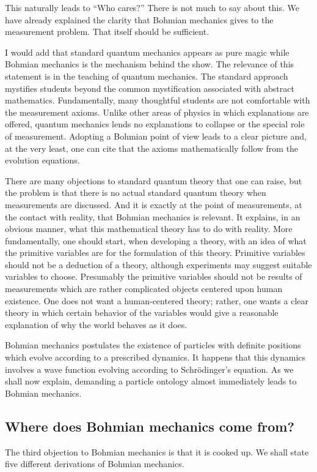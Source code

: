 \documentclass[11pt]{article}
\theoremstyle{remark}
\begin{document}
This naturally leads to ``Who cares?'' There is not much to
say about this. We have already explained the clarity that Bohmian
mechanics gives to the measurement problem. That itself should be
sufficient. 

I would add that standard quantum mechanics appears as pure magic while 
Bohmian mechanics is the mechanism behind the show. The relevance of
this statement is in the teaching of quantum mechanics. The standard
approach mystifies students beyond the common mystification associated
with abstract mathematics. Fundamentally, many thoughtful 
students are not comfortable
with the measurement axioms. Unlike other areas of physics in which
explanations are offered,  quantum mechanics lends no explanations to
collapse or the special role of measurement. Adopting a Bohmian point
of view leads to a clear picture and, at the very least, one can cite
that the axioms mathematically follow from the evolution equations.  


There are many
objections to standard quantum theory that one can raise, but the
problem is that there is no actual standard quantum theory when
measurements are discussed. And it is exactly at the point of
measurements, at the contact with reality, that Bohmian mechanics is
relevant. It explains, in an obvious manner, what this mathematical
theory has to do with reality. More fundamentally, one should start,
when developing a theory, with an idea of what the primitive variables
are for the formulation of this theory. 
Primitive variables should not be a deduction of a theory,
although experiments may suggest suitable variables to choose. 
 Presumably the primitive variables should not be
results of measurements which are rather complicated objects centered
upon human existence. 
One does not want a human-centered theory; rather, one  wants
a clear theory in which certain behavior of the variables would give a
reasonable explanation of why the world behaves as it does. 

Bohmian mechanics postulates the existence of particles with
definite positions which evolve according to a prescribed dynamics. It happens
that this dynamics involves a wave function evolving according to
Schr\"odinger's equation. As we shall now explain, demanding a particle ontology almost
immediately leads to Bohmian mechanics.


\subsection{Where does Bohmian mechanics come from?}
The third objection to Bohmian mechanics is that it is cooked up. We
shall state five different derivations of Bohmian mechanics.
\end{document}
